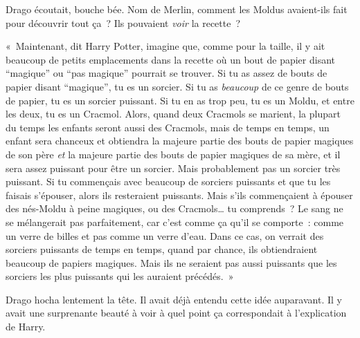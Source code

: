 Drago écoutait, bouche bée. Nom de Merlin, comment les Moldus avaient-ils fait pour découvrir tout ça~? Ils pouvaient \emph{voir} la recette~?

«~Maintenant, dit Harry Potter, imagine que, comme pour la taille, il y ait beaucoup de petits emplacements dans la recette où un bout de papier disant “magique” ou “pas magique” pourrait se trouver. Si tu as assez de bouts de papier disant “magique”, tu es un sorcier. Si tu as \emph{beaucoup} de ce genre de bouts de papier, tu es un sorcier puissant. Si tu en as trop peu, tu es un Moldu, et entre les deux, tu es un Cracmol. Alors, quand deux Cracmols se marient, la plupart du temps les enfants seront aussi des Cracmols, mais de temps en temps, un enfant sera chanceux et obtiendra la majeure partie des bouts de papier magiques de son père \emph{et} la majeure partie des bouts de papier magiques de sa mère, et il sera assez puissant pour être un sorcier. Mais probablement pas un sorcier très puissant. Si tu commençais avec beaucoup de sorciers puissants et que tu les faisais s'épouser, alors ils resteraient puissants. Mais s'ils commençaient à épouser des nés-Moldu à peine magiques, ou des Cracmols… tu comprends~? Le sang ne se mélangerait pas parfaitement, car c'est comme ça qu'il se comporte~: comme un verre de billes et pas comme un verre d'eau. Dans ce cas, on verrait des sorciers puissants de temps en temps, quand par chance, ils obtiendraient beaucoup de papiers magiques. Mais ils ne seraient pas aussi puissants que les sorciers les plus puissants qui les auraient précédés.~»

Drago hocha lentement la tête. Il avait déjà entendu cette idée auparavant. Il y avait une surprenante beauté à voir à quel point ça correspondait à l'explication de Harry.

